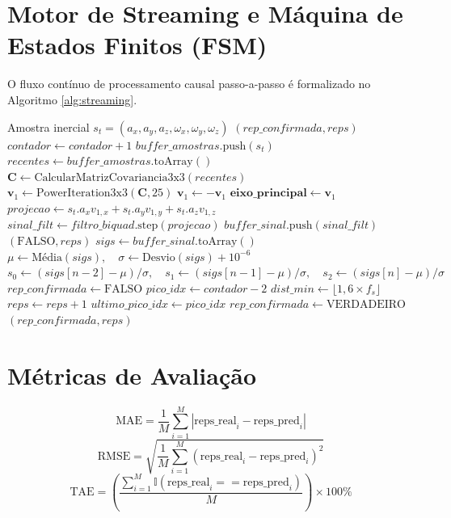 \documentclass[12pt,openany,oneside,a4paper,english,brazil]{abntex2}
\begin{document}
\section{Motor de Streaming e Máquina de Estados Finitos (FSM)}
O fluxo contínuo de processamento causal passo-a-passo é formalizado no Algoritmo \ref{alg:streaming}.

\begin{algorithm}[H]
\caption{Motor de Detecção de Repetições em Tempo Real (Streaming Gymbeat)}
\label{alg:streaming}
\begin{algorithmic}[1]
\REQUIRE Amostra inercial $s_t = (a_x, a_y, a_z, \omega_x, \omega_y, \omega_z)$
\ENSURE $(rep\_confirmada, reps)$
\STATE $contador \leftarrow contador + 1$
\STATE $buffer\_amostras.\text{push}(s_t)$
\STATE $recentes \leftarrow buffer\_amostras.\text{toArray}()$
    \STATE $\mathbf{C} \leftarrow \text{CalcularMatrizCovariancia3x3}(recentes)$
    \STATE $\mathbf{v}_1 \leftarrow \text{PowerIteration3x3}(\mathbf{C}, 25)$
        \STATE $\mathbf{v}_1 \leftarrow -\mathbf{v}_1$
    \ENDIF
    \STATE $\mathbf{eixo\_principal} \leftarrow \mathbf{v}_1$
\ENDIF
\STATE $projecao \leftarrow s_t.a_x v_{1,x} + s_t.a_y v_{1,y} + s_t.a_z v_{1,z}$
\STATE $sinal\_filt \leftarrow filtro\_biquad.\text{step}(projecao)$
\STATE $buffer\_sinal.\text{push}(sinal\_filt)$
    \RETURN $(\text{FALSO}, reps)$
\ENDIF
\STATE $sigs \leftarrow buffer\_sinal.\text{toArray}()$
\STATE $\mu \leftarrow \text{Média}(sigs), \quad \sigma \leftarrow \text{Desvio}(sigs) + 10^{-6}$
\STATE $s_0 \leftarrow (sigs[n-2] - \mu)/\sigma, \quad s_1 \leftarrow (sigs[n-1] - \mu)/\sigma, \quad s_2 \leftarrow (sigs[n] - \mu)/\sigma$
\STATE $rep\_confirmada \leftarrow \text{FALSO}$
    \STATE $pico\_idx \leftarrow contador - 2$
    \STATE $dist\_min \leftarrow \lfloor 1{,}6 \times f_s \rfloor$
        \STATE $reps \leftarrow reps + 1$
        \STATE $ultimo\_pico\_idx \leftarrow pico\_idx$
        \STATE $rep\_confirmada \leftarrow \text{VERDADEIRO}$
    \ENDIF
\ENDIF
\RETURN $(rep\_confirmada, reps)$
\end{algorithmic}
\end{algorithm}

\section{Métricas de Avaliação}
\begin{equation}
    \text{MAE} = \frac{1}{M} \sum_{i=1}^M |\text{reps\_real}_i - \text{reps\_pred}_i|
\end{equation}
\begin{equation}
    \text{RMSE} = \sqrt{\frac{1}{M} \sum_{i=1}^M (\text{reps\_real}_i - \text{reps\_pred}_i)^2}
\end{equation}
\begin{equation}
    \text{TAE} = \left( \frac{\sum_{i=1}^M \mathbb{I}(\text{reps\_real}_i == \text{reps\_pred}_i)}{M} \right) \times 100\%
\end{equation}
\end{document}
